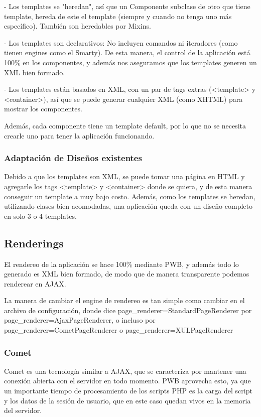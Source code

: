 - Los templates se "heredan", así que un Componente subclase de otro que tiene template, hereda de este el
template (siempre y cuando no tenga uno más específico). También son heredables por Mixins.

- Los templates son declarativos: No incluyen comandos ni iteradores (como tienen engines como el Smarty).
De esta manera, el control de la aplicación está 100\% en los componentes, y además nos aseguramos que los
templates generen un XML bien formado.

- Los templates están basados en XML, con un par de tags extras (<template> y <container>), así que se puede
generar cualquier XML (como XHTML) para mostrar los componentes.

Además, cada componente tiene un template default, por lo que no se necesita crearle uno para tener la aplicación
funcionando.

\subsubsection{Adaptación de Diseños existentes}

Debido a que los templates son XML, se puede tomar una página en HTML y agregarle los tags <template> y <container> donde
se quiera, y de esta manera conseguir un template a muy bajo costo.
Además, como los templates se heredan, utilizando clases bien acomodadas, una aplicación queda con un diseño completo en
solo 3 o 4 templates.


\subsection{Renderings}

El rendereo de la aplicación se hace 100\% mediante PWB, y además todo lo generado es XML bien formado, de
modo que de manera transparente podemos renderear en AJAX.

La manera de cambiar el engine de rendereo es tan simple como cambiar en el archivo de configuración, donde
dice page\_renderer=StandardPageRenderer por page\_renderer=AjaxPageRenderer, o incluso por page\_renderer=CometPageRenderer
o page\_renderer=XULPageRenderer

\subsubsection{Comet}

Comet es una tecnología similar a AJAX, que se caracteriza por mantener una conexión abierta con el servidor
en todo momento. PWB aprovecha esto, ya que un importante tiempo de procesamiento de los scripts PHP es la
carga del script y los datos de la sesión de usuario, que en este caso quedan vivos en la memoria del servidor.

